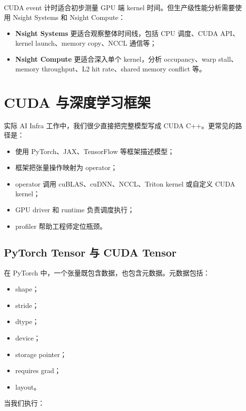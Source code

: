 CUDA event 计时适合初步测量 GPU 端 kernel 时间。但生产级性能分析需要使用 Nsight Systems 和 Nsight Compute：

\begin{itemize}
  \item \textbf{Nsight Systems} 更适合观察整体时间线，包括 CPU 调度、CUDA API、kernel launch、memory copy、NCCL 通信等；
  \item \textbf{Nsight Compute} 更适合深入单个 kernel，分析 occupancy、warp stall、memory throughput、L2 hit rate、shared memory conflict 等。
\end{itemize}

\section{CUDA 与深度学习框架}
\label{sec:cuda-and-dl-frameworks}

实际 AI Infra 工作中，我们很少直接把完整模型写成 CUDA C++。更常见的路径是：

\begin{itemize}
  \item 使用 PyTorch、JAX、TensorFlow 等框架描述模型；
  \item 框架把张量操作映射为 operator；
  \item operator 调用 cuBLAS、cuDNN、NCCL、Triton kernel 或自定义 CUDA kernel；
  \item GPU driver 和 runtime 负责调度执行；
  \item profiler 帮助工程师定位瓶颈。
\end{itemize}

\subsection{PyTorch Tensor 与 CUDA Tensor}
\label{subsec:pytorch-tensor-cuda-tensor}

在 PyTorch 中，一个张量既包含数据，也包含元数据。元数据包括：

\begin{itemize}
  \item shape；
  \item stride；
  \item dtype；
  \item device；
  \item storage pointer；
  \item requires grad；
  \item layout。
\end{itemize}

当我们执行：

